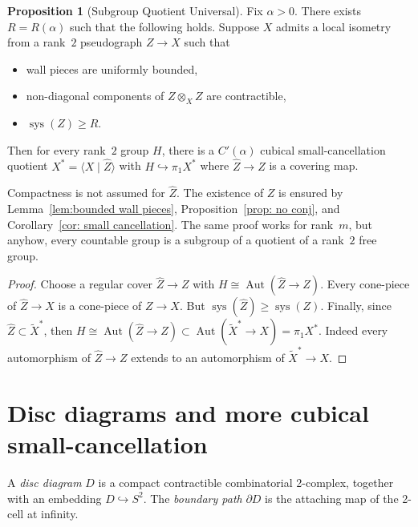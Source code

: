\documentclass[12pt,oneside]{amsart}
\theoremstyle{definition}
\newtheorem{prop}[thm]{Proposition}
\theoremstyle{definition}
\theoremstyle{remark}
\DeclareMathOperator{\sys}{\mathrm sys}
\DeclareMathOperator{\Aut}{Aut}
\begin{document}
\begin{prop}[Subgroup Quotient Universal]\label{prop:squniversal}Fix $\alpha > 0$. There exists $R = R(\alpha)$ such that the following holds.
Suppose $X$ admits a local isometry from a rank~$2$ pseudograph $Z\rightarrow X$  such that
\begin{itemize}
    \item  wall pieces are uniformly bounded,
    \item non-diagonal components of $Z\otimes_X Z$ are contractible,
    \item $\sys(Z)\geq R$.
\end{itemize}
Then for every rank~$2$ group $H$,
there is a $C'(\alpha)$ cubical small-cancellation quotient
$X^*=\langle X \mid \widehat Z\rangle$ with
$H\hookrightarrow \pi_1X^*$ where $\widehat Z \to Z$ is a covering map. 
\end{prop}

Compactness is not assumed for $\widehat Z$.
The existence of $Z$ is ensured by Lemma~\ref{lem:bounded wall pieces}, 
Proposition~\ref{prop: no conj}, and Corollary~\ref{cor: small cancellation}.
The same proof works for rank~$m$, but anyhow, every countable group is a subgroup of a quotient of a rank~$2$ free group.
\begin{proof}
Choose a regular cover $\widehat Z\rightarrow Z$ 
with  $H\cong \Aut(\widehat Z \to Z)$. 
Every cone-piece of $\widehat Z \rightarrow X$ is a cone-piece of $Z\rightarrow X$. But $\sys(\widehat Z)\geq \sys(Z)$.
Finally, since $\widehat Z \subset \widetilde X^*$, then $H\cong \Aut(\widehat Z \rightarrow Z)\subset  \Aut(\widetilde X^*\rightarrow X) =\pi_1X^*$. Indeed  every automorphism of $\widehat Z \rightarrow Z$  extends to an automorphism of $\widetilde X^*\rightarrow X$.
\end{proof}



\section{Disc diagrams and more  cubical small-cancellation }\label{sec: disc diagrams}


A \emph{disc diagram} $D$ is a compact contractible combinatorial 2-complex, together with an embedding $D \hookrightarrow S^2$. The \emph{boundary path} $\partial D$ is the attaching map of the 2-cell at infinity.
\end{document}
